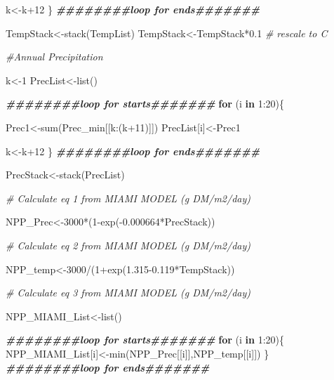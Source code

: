 \documentclass[
  10pt,
  b5paper,
]{book}
\newenvironment{Shaded}{\begin{snugshade}}{\end{snugshade}}
\newcommand{\CommentTok}[1]{\textcolor[rgb]{0.56,0.35,0.01}{\textit{#1}}}
\newcommand{\ControlFlowTok}[1]{\textcolor[rgb]{0.13,0.29,0.53}{\textbf{#1}}}
\newcommand{\DecValTok}[1]{\textcolor[rgb]{0.00,0.00,0.81}{#1}}
\newcommand{\DocumentationTok}[1]{\textcolor[rgb]{0.56,0.35,0.01}{\textbf{\textit{#1}}}}
\newcommand{\FloatTok}[1]{\textcolor[rgb]{0.00,0.00,0.81}{#1}}
\newcommand{\FunctionTok}[1]{\textcolor[rgb]{0.00,0.00,0.00}{#1}}
\newcommand{\NormalTok}[1]{#1}
\newcommand{\OtherTok}[1]{\textcolor[rgb]{0.56,0.35,0.01}{#1}}
\newcommand{\SpecialCharTok}[1]{\textcolor[rgb]{0.00,0.00,0.00}{#1}}
\begin{document}
\begin{Shaded}
\begin{Highlighting}[]
\NormalTok{k}\OtherTok{\textless{}{-}}\NormalTok{k}\SpecialCharTok{+}\DecValTok{12}
\NormalTok{\}}
\DocumentationTok{\#\#\#\#\#\#\#\#loop for ends\#\#\#\#\#\#\#}

\NormalTok{TempStack}\OtherTok{\textless{}{-}}\FunctionTok{stack}\NormalTok{(TempList)}
\NormalTok{TempStack}\OtherTok{\textless{}{-}}\NormalTok{TempStack}\SpecialCharTok{*}\FloatTok{0.1} \CommentTok{\# rescale to C}

\CommentTok{\#Annual Precipitation}

\NormalTok{k}\OtherTok{\textless{}{-}}\DecValTok{1}
\NormalTok{PrecList}\OtherTok{\textless{}{-}}\FunctionTok{list}\NormalTok{()}

\DocumentationTok{\#\#\#\#\#\#\#\#loop for starts\#\#\#\#\#\#\#}
\ControlFlowTok{for}\NormalTok{ (i }\ControlFlowTok{in} \DecValTok{1}\SpecialCharTok{:}\DecValTok{20}\NormalTok{)\{}

\NormalTok{Prec1}\OtherTok{\textless{}{-}}\FunctionTok{sum}\NormalTok{(Prec\_min[[k}\SpecialCharTok{:}\NormalTok{(k}\SpecialCharTok{+}\DecValTok{11}\NormalTok{)]])}
\NormalTok{PrecList[i]}\OtherTok{\textless{}{-}}\NormalTok{Prec1}

\NormalTok{k}\OtherTok{\textless{}{-}}\NormalTok{k}\SpecialCharTok{+}\DecValTok{12}
\NormalTok{\}}
\DocumentationTok{\#\#\#\#\#\#\#\#loop for ends\#\#\#\#\#\#\#}

\NormalTok{PrecStack}\OtherTok{\textless{}{-}}\FunctionTok{stack}\NormalTok{(PrecList)}

\CommentTok{\# Calculate eq 1 from MIAMI MODEL (g DM/m2/day)}

\NormalTok{NPP\_Prec}\OtherTok{\textless{}{-}}\DecValTok{3000}\SpecialCharTok{*}\NormalTok{(}\DecValTok{1}\SpecialCharTok{{-}}\FunctionTok{exp}\NormalTok{(}\SpecialCharTok{{-}}\FloatTok{0.000664}\SpecialCharTok{*}\NormalTok{PrecStack))}

\CommentTok{\# Calculate eq 2 from MIAMI MODEL (g DM/m2/day)}

\NormalTok{NPP\_temp}\OtherTok{\textless{}{-}}\DecValTok{3000}\SpecialCharTok{/}\NormalTok{(}\DecValTok{1}\SpecialCharTok{+}\FunctionTok{exp}\NormalTok{(}\FloatTok{1.315{-}0.119}\SpecialCharTok{*}\NormalTok{TempStack))}

\CommentTok{\# Calculate eq 3 from MIAMI MODEL (g DM/m2/day)}

\NormalTok{NPP\_MIAMI\_List}\OtherTok{\textless{}{-}}\FunctionTok{list}\NormalTok{()}

\DocumentationTok{\#\#\#\#\#\#\#\#loop for starts\#\#\#\#\#\#\#}
\ControlFlowTok{for}\NormalTok{ (i }\ControlFlowTok{in} \DecValTok{1}\SpecialCharTok{:}\DecValTok{20}\NormalTok{)\{}
\NormalTok{NPP\_MIAMI\_List[i]}\OtherTok{\textless{}{-}}\FunctionTok{min}\NormalTok{(NPP\_Prec[[i]],NPP\_temp[[i]])}
\NormalTok{\}}
\DocumentationTok{\#\#\#\#\#\#\#\#loop for ends\#\#\#\#\#\#\#}


\end{Highlighting}
\end{Shaded}
\end{document}
